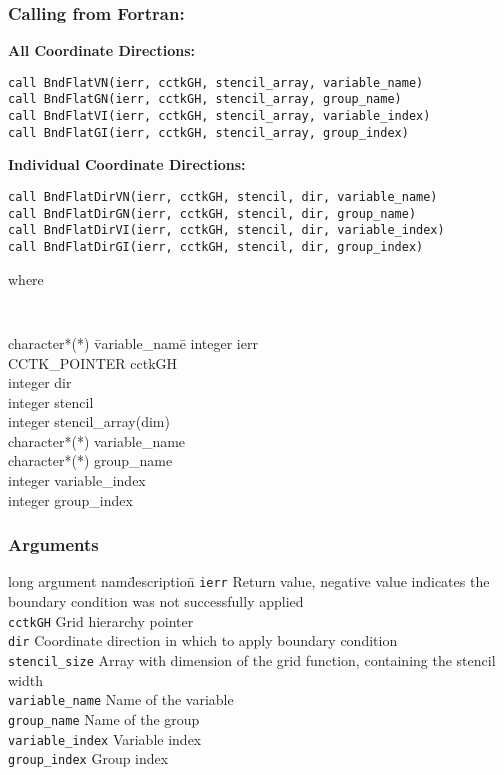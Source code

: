 \documentclass{article}
\begin{document}
\subsubsection*{Calling from Fortran:}

{\bf All Coordinate Directions:}
\begin{verbatim}
call BndFlatVN(ierr, cctkGH, stencil_array, variable_name)
call BndFlatGN(ierr, cctkGH, stencil_array, group_name)
call BndFlatVI(ierr, cctkGH, stencil_array, variable_index)
call BndFlatGI(ierr, cctkGH, stencil_array, group_index)
\end{verbatim}

\noindent
{\bf Individual Coordinate Directions:}
\begin{verbatim}
call BndFlatDirVN(ierr, cctkGH, stencil, dir, variable_name)
call BndFlatDirGN(ierr, cctkGH, stencil, dir, group_name)
call BndFlatDirVI(ierr, cctkGH, stencil, dir, variable_index)
call BndFlatDirGI(ierr, cctkGH, stencil, dir, group_index)
\end{verbatim}
where
{\tt
\begin{tabbing}
character*(*) \= variable\_name\=\kill
integer \> ierr \\
CCTK\_POINTER \> cctkGH\\
integer \> dir\\
integer \> stencil\\
integer \> stencil\_array(dim)\\
character*(*) \> variable\_name\\
character*(*) \> group\_name\\
integer \> variable\_index\\
integer \> group\_index
\end{tabbing}
}

\subsubsection*{Arguments}
\begin{tabbing}
long argument nam\= description\=\kill
{\tt ierr} \> Return value, negative value indicates the
boundary condition was not successfully applied\\
{\tt cctkGH} \> Grid hierarchy pointer\\
{\tt dir} \> Coordinate direction in which to apply boundary condition\\
{\tt stencil\_size} \> Array with dimension of the grid function, containing the stencil width\\
{\tt variable\_name} \> Name of the variable\\
{\tt group\_name} \> Name of the group\\
{\tt variable\_index} \> Variable index\\
{\tt group\_index} \> Group index\\
\end{tabbing}
\end{document}
